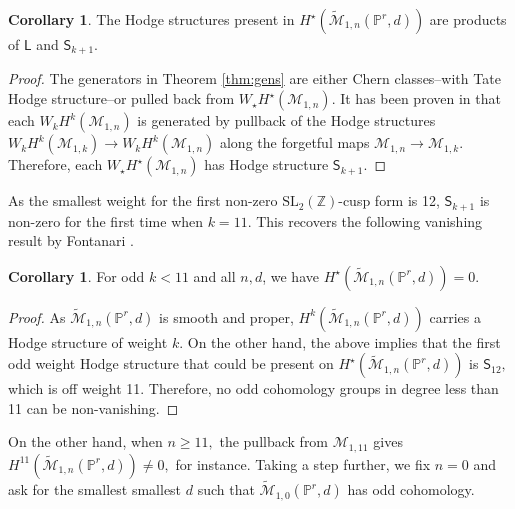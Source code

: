 \documentclass[12pt,reqno]{amsart}
\theoremstyle{definition}
\theoremstyle{definition}
\theoremstyle{definition}
\theoremstyle{definition}
\newtheorem{corollary}[theorem]{Corollary}
\newcommand{\Mtil}{\widetilde{\mathcal{M}}}
\begin{document}
\begin{corollary}
  The Hodge structures present in $H^\star(\Mtil_{1,n}(\mathbb{P}^r,d))$ are products of $\mathsf{L}$ and $\mathsf{S}_{k+1}.$
\end{corollary}
\begin{proof}
  The generators in Theorem \ref{thm:gens} are either Chern classes--with Tate Hodge structure--or pulled back from $W_\star H^\star(\mathcal{M}_{1,n}).$ It has been proven in \cite[§2]{clp} that each $W_k H^k(\mathcal{M}_{1,n})$ is generated by pullback of the Hodge structures $W_k H^k(\mathcal{M}_{1,k})\to W_k H^k(\mathcal{M}_{1,n})$ along the forgetful maps $\mathcal{M}_{1,n}\to \mathcal{M}_{1,k}.$ Therefore, each $W_\star H^\star(\mathcal{M}_{1,n})$ has Hodge structure $\mathsf{S}_{k+1}.$
\end{proof}

As the smallest weight for the first non-zero  $\mathrm{SL}_2(\mathbb{Z})$-cusp form is 12, $\mathsf{S}_{k+1}$ is non-zero for the first time when $k = 11.$ This recovers the following vanishing result by Fontanari \cite{Fontanari}.
\begin{corollary}\label{cor:oddvan}
  For odd $k<11$ and all $n,d$, we have $H^\star(\Mtil_{1,n}(\mathbb{P}^r,d)) = 0.$
\end{corollary}
\begin{proof}
  As $\Mtil_{1,n}(\mathbb{P}^r,d)$ is smooth and proper, $H^k(\Mtil_{1,n}(\mathbb{P}^r,d))$ carries a Hodge structure of weight $k.$ On the other hand, the above implies that the first odd weight Hodge structure that could be present on $H^\star(\Mtil_{1,n}(\mathbb{P}^r,d))$ is $\mathsf{S}_{12},$ which is off weight 11. Therefore, no odd cohomology groups in degree less than 11 can be non-vanishing.
\end{proof}

On the other hand, when $n\geq 11,$ the pullback from $\mathcal{M}_{1,11}$ gives $H^{11}(\Mtil_{1,n}(\mathbb{P}^r,d))\neq 0,$ for instance. Taking a step further, we fix $n=0$ and ask for the smallest smallest $d$ such that $\Mtil_{1,0}(\mathbb{P}^r,d)$ has odd cohomology.
\end{document}
